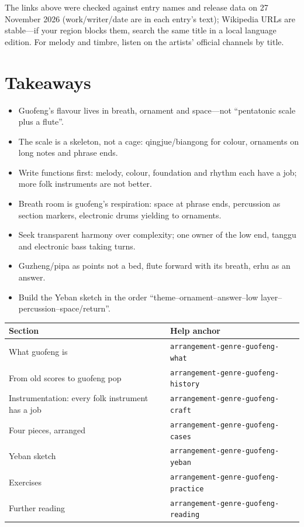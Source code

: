 The links above were checked against entry names and release data on 27 November 2026 (work/writer/date are in each entry's text); Wikipedia URLs are stable---if your region blocks them, search the same title in a local language edition. For melody and timbre, listen on the artists' official channels by title.

\section{Takeaways}
\label{sec:guofeng-takeaways}

\begin{itemize}
\item Guofeng's flavour lives in breath, ornament and space---not ``pentatonic scale plus a flute''.
\item The scale is a skeleton, not a cage: qingjue/biangong for colour, ornaments on long notes and phrase ends.
\item Write functions first: melody, colour, foundation and rhythm each have a job; more folk instruments are not better.
\item Breath room is guofeng's respiration: space at phrase ends, percussion as section markers, electronic drums yielding to ornaments.
\item Seek transparent harmony over complexity; one owner of the low end, tanggu and electronic bass taking turns.
\item Guzheng/pipa as points not a bed, flute forward with its breath, erhu as an answer.
\item Build the Yeban sketch in the order ``theme--ornament--answer--low layer--percussion--space/return''.
\end{itemize}

\begin{helpmapping}
\begin{longtable}{p{}p{}}
\toprule
Section & Help anchor \\
\midrule
What guofeng is & \texttt{arrangement-genre-guofeng-what} \\
From old scores to guofeng pop & \texttt{arrangement-genre-guofeng-history} \\
Instrumentation: every folk instrument has a job & \texttt{arrangement-genre-guofeng-craft} \\
Four pieces, arranged & \texttt{arrangement-genre-guofeng-cases} \\
Yeban sketch & \texttt{arrangement-genre-guofeng-yeban} \\
Exercises & \texttt{arrangement-genre-guofeng-practice} \\
Further reading & \texttt{arrangement-genre-guofeng-reading} \\
\bottomrule
\end{longtable}
\end{helpmapping}


